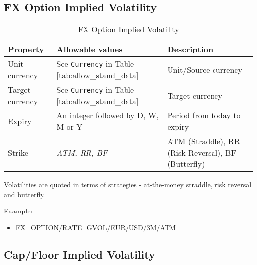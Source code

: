 \subsection{FX Option Implied Volatility}

\begin{table}[H]
\centering
\begin{tabular}{|p{3cm}|p{3.5cm}|p{7cm}|}
\hline
{\bf Property} & {\bf Allowable values} & {\bf Description} \\
\hline
Unit currency & See \lstinline!Currency! in Table \ref{tab:allow_stand_data}& Unit/Source currency\\ \hline
Target currency & See \lstinline!Currency! in Table \ref{tab:allow_stand_data} & Target currency\\ \hline
Expiry & An integer followed by D, W, M or Y & Period from today to expiry \\ \hline
Strike & \emph{ATM, RR, BF} & ATM (Straddle), RR (Risk Reversal), BF (Butterfly) \\
\hline
\end{tabular}
  \caption{FX Option Implied Volatility}
  \label{tab:fximplvol_quote}
\end{table}

Volatilities are quoted in terms of strategies - at-the-money straddle, risk reversal and butterfly. 

\medskip
Example: 
\begin{itemize}
\item {FX\_OPTION/RATE\_GVOL/EUR/USD/3M/ATM}
\end{itemize}

\subsection{Cap/Floor Implied Volatility}\label{ss:capfloor_impl_vol_quote}

